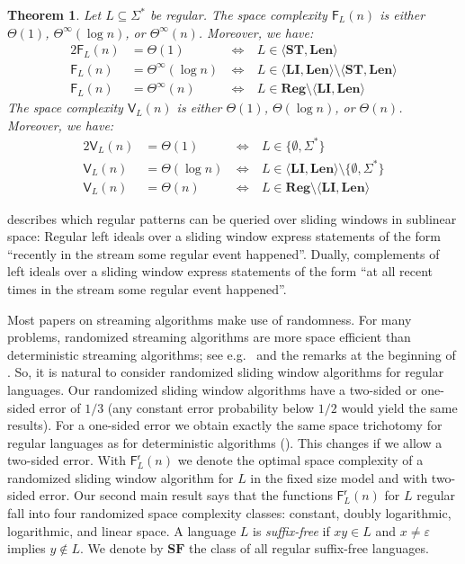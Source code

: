 \documentclass{article}\usepackage[a4paper,margin=20mm]{geometry}
\newtheorem{theorem}{Theorem}\newtheorem{lemma}[theorem]{Lemma}\newtheorem{proposition}[theorem]{Proposition}\newtheorem{corollary}[theorem]{Corollary}\newtheorem{definition}[theorem]{Definition}\newtheorem{claim}[theorem]{Claim}\newtheorem{remark}[theorem]{Remark}\newtheorem{observation}[theorem]{Observation}\newtheorem{conjecture}[theorem]{Conjecture}\newtheorem{example}[theorem]{Example}
\newcommand{\F}{\mathsf{F}}
\newcommand{\V}{\mathsf{V}}
\renewcommand{\r}{\mathsf{r}}
\newcommand{\Reg}{\mathbf{Reg}}
\newcommand{\Len}{\mathbf{Len}}
\newcommand{\LI}{\mathbf{LI}}
\newcommand{\ST}{\mathbf{ST}}
\newcommand{\SF}{\mathbf{SF}}
\newcommand{\eps}{\varepsilon}
\newcommand{\Thetainf}{\Theta^{\scriptscriptstyle{\infty}}}
\begin{document}
\begin{theorem}
	\label{thm:big-thm}
	Let $L \subseteq \Sigma^*$ be regular.
	The space complexity
	$\F_L(n)$ is either $\Theta(1)$, $\Thetainf(\log n)$, or $\Thetainf(n)$. Moreover, we have:
	\begin{alignat*}{2}
	\F_L(n) &= \Theta(1) & \ \iff \ & L \in \langle \ST, \Len \rangle \\
	\F_L(n) &= \Thetainf(\log n) & \ \iff \ & L \in \langle \LI, \Len \rangle \setminus \langle \ST, \Len \rangle \\
	\F_L(n) &= \Thetainf(n) & \ \iff \ & L \in \Reg  \setminus \langle \LI, \Len \rangle 
	\end{alignat*}
	The space complexity 
	$\V_L(n)$ is either $\Theta(1)$, $\Theta(\log n)$, or $\Theta(n)$. Moreover, we have:
	\begin{alignat*}{2}
	\V_L(n) &= \Theta(1) & \ \iff \ & L \in \{\emptyset, \Sigma^*\} \\
	\V_L(n) &= \Theta(\log n) & \ \iff \ & L \in \langle \LI, \Len \rangle \setminus \{\emptyset, \Sigma^*\} \\
	\V_L(n) &= \Theta(n) & \ \iff \ & L \in \Reg  \setminus \langle \LI, \Len \rangle
	\end{alignat*}
	\end{theorem}

 describes which regular patterns can be queried over sliding windows in sublinear space:
Regular left ideals over a sliding window express statements of the form ``recently in the stream some regular event happened''.
Dually, complements of left ideals over a sliding window express statements of the form
``at all recent times in the stream some regular event happened''.

Most papers on streaming algorithms make use of randomness. For many problems, randomized
streaming algorithms are more space efficient than deterministic streaming algorithms; see e.g.~\cite{AlonMS99}
and the remarks at the beginning of .
So, it is natural to consider
randomized sliding window algorithms for regular languages. 
Our randomized sliding window algorithms have a two-sided or one-sided error of $1/3$ (any constant error probability below $1/2$ would yield the same results).
For a one-sided error we obtain exactly the same space trichotomy for regular languages 
as for deterministic algorithms (). This changes if we allow a two-sided error.
With $\F^\r_L(n)$ we denote the optimal space complexity of a randomized
sliding window algorithm for $L$ in the fixed size model and with two-sided error. Our second main result says 
that the functions $\F^\r_L(n)$ for $L$ regular fall into four randomized space complexity classes:
constant, doubly logarithmic, logarithmic, and linear space.
A language $L$ is {\em suffix-free} if $xy \in L$ and $x \neq \eps$ implies $y \notin L$.
We denote by $\SF$ the class of all regular suffix-free languages.
\end{document}

